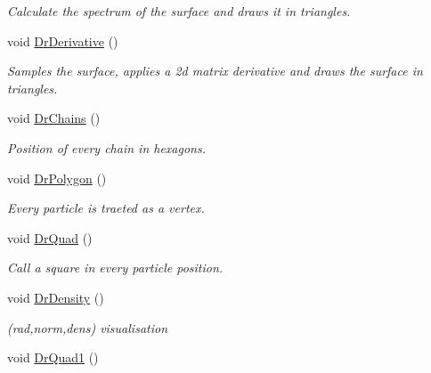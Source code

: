 \begin{DoxyCompactItemize}
\begin{DoxyCompactList}\small\item\em Calculate the spectrum of the surface and draws it in triangles. \end{DoxyCompactList}\item 
void \hyperlink{classElPoly_aaafb3fae855c37686197d2d1f66cea4c}{Dr\+Derivative} ()\hypertarget{classElPoly_aaafb3fae855c37686197d2d1f66cea4c}{}\label{classElPoly_aaafb3fae855c37686197d2d1f66cea4c}

\begin{DoxyCompactList}\small\item\em Samples the surface, applies a 2d matrix derivative and draws the surface in triangles. \end{DoxyCompactList}\item 
void \hyperlink{classElPoly_aee4f14af2142abdfefdb0b0cd7ac6db3}{Dr\+Chains} ()\hypertarget{classElPoly_aee4f14af2142abdfefdb0b0cd7ac6db3}{}\label{classElPoly_aee4f14af2142abdfefdb0b0cd7ac6db3}

\begin{DoxyCompactList}\small\item\em Position of every chain in hexagons. \end{DoxyCompactList}\item 
void \hyperlink{classElPoly_a214894e61823ee214875334b23fa69c2}{Dr\+Polygon} ()\hypertarget{classElPoly_a214894e61823ee214875334b23fa69c2}{}\label{classElPoly_a214894e61823ee214875334b23fa69c2}

\begin{DoxyCompactList}\small\item\em Every particle is traeted as a vertex. \end{DoxyCompactList}\item 
void \hyperlink{classElPoly_a626c51b506cf13c725c26652f9a25926}{Dr\+Quad} ()\hypertarget{classElPoly_a626c51b506cf13c725c26652f9a25926}{}\label{classElPoly_a626c51b506cf13c725c26652f9a25926}

\begin{DoxyCompactList}\small\item\em Call a square in every particle position. \end{DoxyCompactList}\item 
void \hyperlink{classElPoly_a04dd5a15e1151a49baece8c9196ca614}{Dr\+Density} ()\hypertarget{classElPoly_a04dd5a15e1151a49baece8c9196ca614}{}\label{classElPoly_a04dd5a15e1151a49baece8c9196ca614}

\begin{DoxyCompactList}\small\item\em (rad,norm,dens) visualisation \end{DoxyCompactList}\item 
void \hyperlink{classElPoly_a725549fe7e1a9fbb5e6710bfc17ce007}{Dr\+Quad1} ()\hypertarget{classElPoly_a725549fe7e1a9fbb5e6710bfc17ce007}{}\label{classElPoly_a725549fe7e1a9fbb5e6710bfc17ce007}


\end{DoxyCompactItemize}
